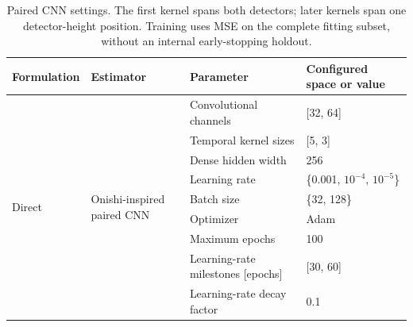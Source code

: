 \begin{table}[t]
\centering
\small
\begin{tabularx}{\textwidth}{@{}p{}p{}p{}X@{}}
\toprule
Formulation & Estimator & Parameter & Configured space or value \\
\midrule
\multirow[t]{9}{*}{Direct} & \multirow[t]{9}{=}{Onishi-inspired paired CNN} & Convolutional channels & [32, 64] \\
 &  & Temporal kernel sizes & [5, 3] \\
 &  & Dense hidden width & 256 \\
 &  & Learning rate & \{0.001, $10^{-4}$, $10^{-5}$\} \\
 &  & Batch size & \{32, 128\} \\
 &  & Optimizer & Adam \\
 &  & Maximum epochs & 100 \\
 &  & Learning-rate milestones [epochs] & [30, 60] \\
 &  & Learning-rate decay factor & 0.1 \\
\bottomrule
\end{tabularx}
\caption{Paired CNN settings. The first kernel spans both detectors; later kernels span one detector-height position. Training uses MSE on the complete fitting subset, without an internal early-stopping holdout.}
\label{tab:space-paired-cnn}
\end{table}

